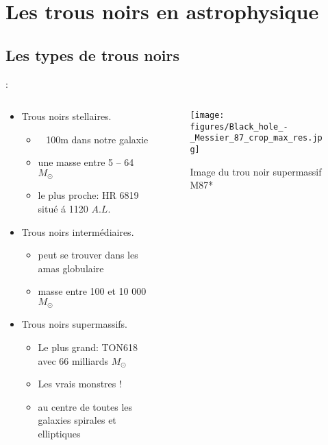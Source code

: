 \section{Les trous noirs en astrophysique}

\subsection{Les types de trous noirs}
\begin{frame}{\underline{\secname} : {\small \subsecname }}
  \begin{columns}
  	    \begin{column}{0.7\linewidth}

\begin{itemize}
	 \setlength\itemsep{0em}
	\item Trous noirs stellaires.
	 \begin{itemize}
	 	\item ~ 100m dans notre galaxie
	 	\item une masse entre 5 – 64 \(M_\odot\)
\item  le plus proche: HR 6819 situé \'{a} 1120 $A.L.$ %
	\end{itemize}
	\item Trous noirs intermédiaires.
\begin{itemize}
	\item peut se trouver dans les amas globulaire
	\item  masse entre 100 et 10 000 \(M_\odot\)
\end{itemize}

	\item Trous noirs supermassifs.
	 \begin{itemize}
\item  Le plus grand: TON618 avec  66 milliards \(M_\odot\)
\item Les vrais monstres !
\item au centre de toutes les galaxies spirales et elliptiques

	\end{itemize}

\end{itemize} 

 \end{column}
\begin{column}{0.3\linewidth}
      \begin{figure}
	\centering
\texttt{[image: figures/Black\_hole\_-\_Messier\_87\_crop\_max\_res.jpg]}
	\caption{Image du trou noir supermassif M87*}
\end{figure}
\end{column}
\end{columns}

\end{frame}


